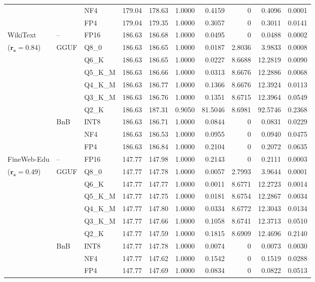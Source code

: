\begin{longtable}{ll l rrrrrrr}
 &  & NF4 & 179.04 & 178.63 & 1.0000 & 0.4159 & \cellcolor{cyan!12} $0$ & 0.4096 & 0.0001 \\
 &  & FP4 & 179.04 & 179.35 & 1.0000 & 0.3057 & \cellcolor{cyan!12} $0$ & 0.3011 & 0.0141 \\
\midrule
WikiText & -- & FP16 & 186.63 & 186.68 & 1.0000 & 0.0495 & \cellcolor{cyan!12} $0$ & 0.0488 & 0.0002 \\
{\small ($\mathbf{r_s{=}0.84}$)} & GGUF & Q8\_0 & 186.63 & 186.65 & 1.0000 & 0.0187 & 2.8036 & 3.9833 & 0.0008 \\
 &  & Q6\_K & 186.63 & 186.65 & 1.0000 & 0.0227 & 8.6688 & 12.2819 & 0.0090 \\
 &  & Q5\_K\_M & 186.63 & 186.66 & 1.0000 & 0.0313 & 8.6676 & 12.2886 & 0.0068 \\
 &  & Q4\_K\_M & 186.63 & 186.77 & 1.0000 & 0.1366 & 8.6676 & 12.3924 & 0.0113 \\
 &  & Q3\_K\_M & 186.63 & 186.76 & 1.0000 & 0.1351 & 8.6715 & 12.3964 & 0.0549 \\
 &  & Q2\_K & 186.63 & 187.31 & \cellcolor{red!18} 0.9050 & \cellcolor{red!18} 81.5046 & 8.6981 & \cellcolor{red!18} 92.5746 & \cellcolor{red!18} 0.2368 \\
 & BnB & INT8 & 186.63 & 186.71 & 1.0000 & 0.0844 & \cellcolor{cyan!12} $0$ & 0.0831 & 0.0229 \\
 &  & NF4 & 186.63 & 186.53 & 1.0000 & 0.0955 & \cellcolor{cyan!12} $0$ & 0.0940 & 0.0475 \\
 &  & FP4 & 186.63 & 186.84 & 1.0000 & 0.2104 & \cellcolor{cyan!12} $0$ & 0.2072 & 0.0635 \\
\midrule
FineWeb-Edu & -- & FP16 & 147.77 & 147.98 & 1.0000 & 0.2143 & \cellcolor{cyan!12} $0$ & 0.2111 & 0.0003 \\
{\small ($\mathbf{r_s{=}0.49}$)} & GGUF & Q8\_0 & 147.77 & 147.78 & 1.0000 & 0.0057 & 2.7993 & 3.9644 & 0.0001 \\
 &  & Q6\_K & 147.77 & 147.77 & 1.0000 & 0.0011 & 8.6771 & 12.2723 & 0.0014 \\
 &  & Q5\_K\_M & 147.77 & 147.75 & 1.0000 & 0.0181 & 8.6754 & 12.2867 & 0.0034 \\
 &  & Q4\_K\_M & 147.77 & 147.80 & 1.0000 & 0.0334 & 8.6772 & 12.3043 & 0.0134 \\
 &  & Q3\_K\_M & 147.77 & 147.66 & 1.0000 & 0.1058 & 8.6741 & 12.3713 & 0.0510 \\
 &  & Q2\_K & 147.77 & 147.59 & 1.0000 & 0.1815 & 8.6909 & 12.4696 & 0.2140 \\
 & BnB & INT8 & 147.77 & 147.78 & 1.0000 & 0.0074 & \cellcolor{cyan!12} $0$ & 0.0073 & 0.0030 \\
 &  & NF4 & 147.77 & 147.62 & 1.0000 & 0.1542 & \cellcolor{cyan!12} $0$ & 0.1519 & 0.0288 \\
 &  & FP4 & 147.77 & 147.69 & 1.0000 & 0.0834 & \cellcolor{cyan!12} $0$ & 0.0822 & 0.0513 \\
\end{longtable}
\endgroup